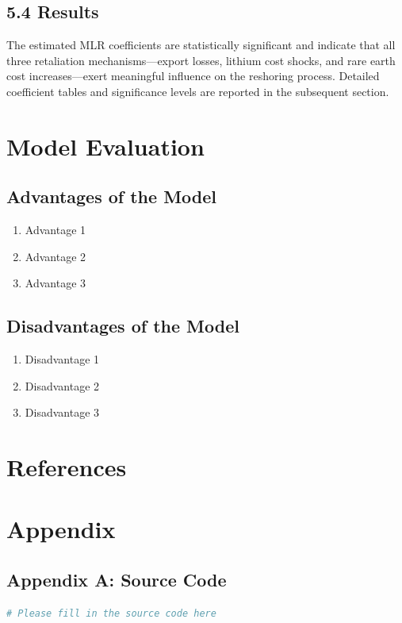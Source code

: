 \documentclass{apmcmthesis}
\begin{document}
\subsection*{5.4 Results}

The estimated MLR coefficients are statistically significant and indicate that all three retaliation mechanisms---export losses, lithium cost shocks, and rare earth cost increases---exert meaningful influence on the reshoring process. Detailed coefficient tables and significance levels are reported in the subsequent section.


\newpage
\section{Model Evaluation}
\subsection{Advantages of the Model}
\begin{enumerate}
    \item Advantage 1
    \item Advantage 2
    \item Advantage 3
\end{enumerate}

\subsection{Disadvantages of the Model}
\begin{enumerate}
    \item Disadvantage 1
    \item Disadvantage 2
    \item Disadvantage 3
\end{enumerate}


\newpage
\section*{References}






\newpage
\section*{Appendix}
\subsection{Appendix A: Source Code}
\begin{lstlisting}[language=python,caption={Python Source Code for Question 1}]
# Please fill in the source code here
\end{lstlisting}
\end{document}
